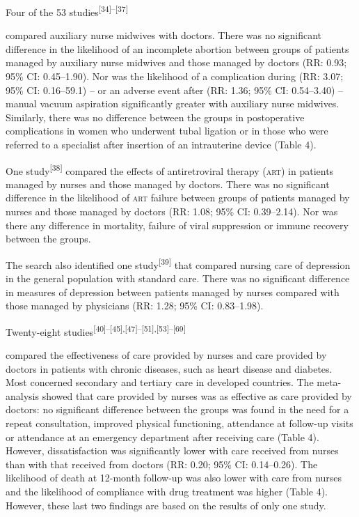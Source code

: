 \documentclass{article}
\begin{document}
Four of the 53 studies\textsuperscript{[}\textsuperscript{34}\textsuperscript{]}\textsuperscript{–}\textsuperscript{[}\textsuperscript{37}\textsuperscript{]}

compared auxiliary nurse midwives with doctors. There was no significant
difference in the
likelihood of an incomplete abortion between groups of patients managed by
auxiliary nurse midwives
and those managed by doctors (RR: 0.93; 95\% CI: 0.45–1.90). Nor was the
likelihood of a
complication during (RR: 3.07; 95\% CI: 0.16–59.1) – or an adverse event after
(RR:
1.36; 95\% CI: 0.54–3.40) – manual vacuum aspiration significantly greater with
auxiliary nurse midwives. Similarly, there was no difference between the groups
in postoperative
complications in women who underwent tubal ligation or in those who were
referred to a specialist
after insertion of an intrauterine device (Table 4).

One study\textsuperscript{[}\textsuperscript{38}\textsuperscript{]}
compared the effects of
antiretroviral therapy (\textsc{art}) in patients managed by nurses and those managed by
doctors. There was
no significant difference in the likelihood of \textsc{art} failure between groups of
patients managed by
nurses and those managed by doctors (RR: 1.08; 95\% CI: 0.39–2.14). Nor was
there any
difference in mortality, failure of viral suppression or immune recovery between
the groups.

The search also identified one study\textsuperscript{[}\textsuperscript{39}\textsuperscript{]}
that
compared nursing care of depression in the general population with standard
care. There was no
significant difference in measures of depression between patients managed by
nurses compared with
those managed by physicians (RR: 1.28; 95\% CI: 0.83–1.98).

Twenty-eight studies\textsuperscript{[}\textsuperscript{40}\textsuperscript{]}\textsuperscript{–}\textsuperscript{[}\textsuperscript{45}\textsuperscript{]}\textsuperscript{,}\textsuperscript{[}\textsuperscript{47}\textsuperscript{]}\textsuperscript{–}\textsuperscript{[}\textsuperscript{51}\textsuperscript{]}\textsuperscript{,}\textsuperscript{[}\textsuperscript{53}\textsuperscript{]}\textsuperscript{–}\textsuperscript{[}\textsuperscript{69}\textsuperscript{]}

compared the effectiveness of care provided by nurses and care provided by
doctors in patients with
chronic diseases, such as heart disease and diabetes. Most concerned secondary
and tertiary care in
developed countries. The meta-analysis showed that care provided by nurses was
as effective as care
provided by doctors: no significant difference between the groups was found in
the need for a repeat
consultation, improved physical functioning, attendance at follow-up visits or
attendance at an
emergency department after receiving care (Table 4).
However, dissatisfaction was significantly lower with care received from nurses
than with that
received from doctors (RR: 0.20; 95\% CI: 0.14–0.26). The likelihood of death at
12-month
follow-up was also lower with care from nurses and the likelihood of compliance
with drug treatment
was higher (Table 4). However, these last two findings
are based on the results of only one study.
\end{document}
